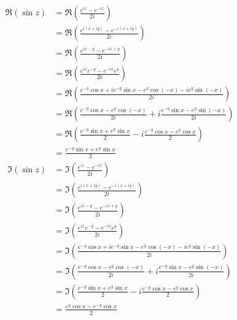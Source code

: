 \documentclass[fleqn, a4paper, 11pt, oneside]{amsart}
\theoremstyle{definition}
\theoremstyle{theorem}
\begin{document}
\begin{solution}
	\begin{align*}
		\Re(\sin z) & = \Re\left( \frac{e^{i z} - e^{-i z}}{2 i} \right)                                                        \\
                            & = \Re\left( \frac{e^{i (x + i y)} - e^{-i (x + i y)}}{2 i} \right)                                        \\
                            & = \Re\left( \frac{e^{i x - y} - e^{-i x + y}}{2 i} \right)                                                \\
                            & = \Re\left( \frac{e^{i x} e^{-y} - e^{-i x} e^{y}}{2 i} \right)                                           \\
                            & = \Re\left( \frac{e^{-y} \cos x + i e^{-y} \sin x - e^y \cos(-x) - i e^y \sin(-x)}{2 i} \right)           \\
                            & = \Re\left( \frac{e^{-y} \cos x - e^y \cos(-x)}{2 i} + i \frac{e^{-y} \sin x - e^y \sin(-x)}{2 i} \right) \\
                            & = \Re\left( \frac{e^{-y} \sin x + e^y \sin x}{2} - i \frac{e^{-y} \cos x - e^y \cos x}{2} \right)         \\
                            & = \frac{e^{-y} \sin x + e^y \sin x}{2}
	\end{align*}
	\begin{align*}
		\Im(\sin z) & = \Im\left( \frac{e^{i z} - e^{-i z}}{2 i} \right)                                                        \\
                            & = \Im\left( \frac{e^{i (x + i y)} - e^{-i (x + i y)}}{2 i} \right)                                        \\
                            & = \Im\left( \frac{e^{i x - y} - e^{-i x + y}}{2 i} \right)                                                \\
                            & = \Im\left( \frac{e^{i x} e^{-y} - e^{-i x} e^{y}}{2 i} \right)                                           \\
                            & = \Im\left( \frac{e^{-y} \cos x + i e^{-y} \sin x - e^y \cos(-x) - i e^y \sin(-x)}{2 i} \right)           \\
                            & = \Im\left( \frac{e^{-y} \cos x - e^y \cos(-x)}{2 i} + i \frac{e^{-y} \sin x - e^y \sin(-x)}{2 i} \right) \\
                            & = \Im\left( \frac{e^{-y} \sin x + e^y \sin x}{2} - i \frac{e^{-y} \cos x - e^y \cos x}{2} \right)         \\
                            & = \frac{e^y \cos x - e^{-y} \cos x}{2}
	\end{align*}
\end{solution}
\end{document}
